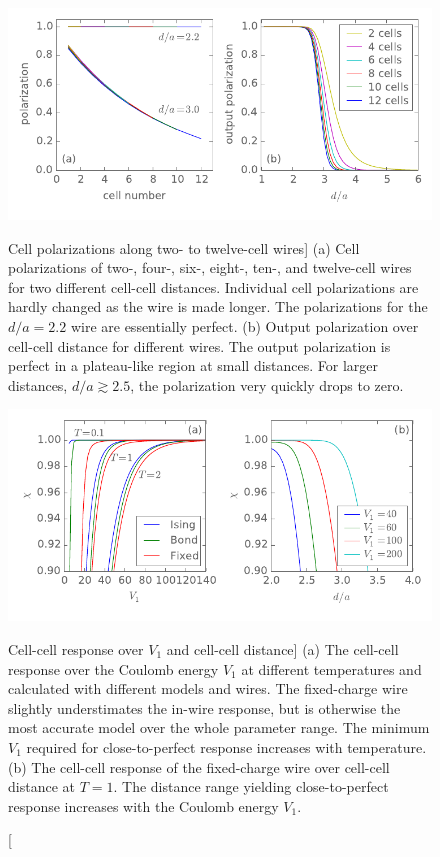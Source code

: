 \begin{figure}
  \center
  \includegraphics{wire_polarization}
  \vspace*{-0.5cm}
  \caption
  [Cell polarizations along two- to twelve-cell wires]
  {
  \label{fig:wire_polarization}
  (a) Cell polarizations of two-, four-, six-, eight-, ten-, and twelve-cell
  wires for two different cell-cell distances. Individual cell polarizations are
  hardly changed as the wire is made longer. The polarizations for the $d/a =
  2.2$ wire are essentially perfect.
  (b) Output polarization over cell-cell distance for different wires. The
  output polarization is perfect in a plateau-like region at small distances.
  For larger distances, $d/a \gtrsim 2.5$, the polarization very quickly drops
  to zero.
  }

  \vspace*{0.75cm}
  
  \includegraphics{chis}
  \vspace*{-0.5cm}
  \caption
  [Cell-cell response over $V_1$ and cell-cell distance]
  {
  \label{fig:chis}
  (a) The cell-cell response over the Coulomb energy $V_1$ at different
  temperatures and calculated with different models and wires. The fixed-charge
  wire slightly understimates the in-wire response, but is otherwise the most
  accurate model over the whole parameter range. The minimum $V_1$ required for
  close-to-perfect response increases with temperature.
  (b) The cell-cell response of the fixed-charge wire over cell-cell distance at
  $T = 1$. The distance range yielding close-to-perfect response increases with
  the Coulomb energy $V_1$.
  }
\end{figure}

